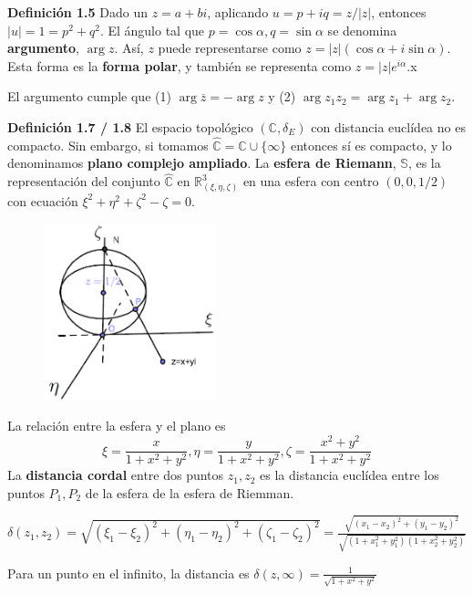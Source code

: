 \documentclass[a4paper, 11pt]{extarticle}
\newcommand{\defi}[1]{\textcolor{azul}{\textbf{Definición #1}}}
\begin{document}
\begin{multicols*}{2}
\defi{1.5} Dado un \(z = a + bi\), aplicando \(u = p + iq = z/|z|\),
entonces \(|u| = 1 = p^2 + q^2\). El ángulo tal que \(p = \cos \alpha, q =
\sin \alpha\) se denomina \textbf{argumento}, \(\arg z\).  Así, \(z\) puede representarse como \(z
= |z|(\cos  \alpha  + i \sin \alpha )\). Esta forma es la \textbf{forma polar}, y
también se representa como \(z = |z|e^{i\alpha}\).x 

El argumento cumple que (1) \(\arg \overline{z} = - \arg z\) y (2) \(\arg
z_1z_2 = \arg z_1 + \arg z_2\).

\defi{1.7 / 1.8} El espacio topológico \((\mathbb{C}, \delta_E)\) con distancia
euclídea no es compacto. Sin embargo, si tomamos \(\hat{\mathbb{C}} =
\mathbb{C} \cup \{ \infty \}\) entonces sí es compacto, y lo denominamos \textbf{plano
complejo ampliado}. La \textbf{esfera de Riemann}, \(\mathbb{S}\), es la representación del conjunto \(\hat{\mathbb{C}}\) en \(\mathbb{R}^3_{(\xi, \eta, \zeta)}\) en una esfera con
centro \((0, 0, 1/2)\) con ecuación \(\xi^{2}+\eta^{2}+\zeta^{2}-\zeta=0\).
\begin{figure}[H]
\centering
\includegraphics[width=5cm]{imagenes/esfera.png}
\end{figure}
La relación entre la esfera y el plano es 
\[ \xi=\frac{x}{1+x^{2}+y^{2}}, \eta=\frac{y}{1+x^{2}+y^{2}}, \zeta=\frac{x^{2}+y^{2}}{1+x^{2}+y^{2}} \]
La \textbf{distancia cordal} entre dos puntos \(z_1,z_2\) es la distancia euclídea 
entre los puntos \(P_1,P_2\) de la esfera de la esfera de Riemman.

\(\delta(z_1,z_2) =
 \sqrt{\left(\xi_{1}-\xi_{2}\right)^{2}+\left(\eta_{1}-\eta_{2}\right)^{2}+\left(\zeta_{1}-\zeta_{2}\right)^{2}}
 = \frac{\sqrt{\left(x_{1}-x_{2}\right)^{2}+\left(y_{1}-y_{2}\right)^{2}}}{
\sqrt{\left(1+x_{1}^{2}+y_{1}^{2}\right)\left(1+x_{2}^{2}+y_{2}^{2}\right)}}\)

Para un punto en el infinito, la distancia es \(\delta(z, \infty)=\frac{1}{\sqrt{1+x^{2}+y^{2}}}\)

\end{multicols*}
\pagebreak
\end{document}
